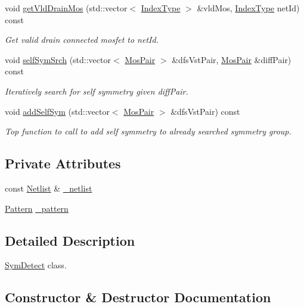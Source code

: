 \begin{DoxyCompactItemize}
void \hyperlink{classSymDetect_a48c23173bf5e56c3aa11ac306715cba2}{get\+Vld\+Drain\+Mos} (std\+::vector$<$ \hyperlink{type_8h_a581e8093e28e7362f2b6937296190676}{Index\+Type} $>$ \&vld\+Mos, \hyperlink{type_8h_a581e8093e28e7362f2b6937296190676}{Index\+Type} net\+Id) const
\begin{DoxyCompactList}\small\item\em Get valid drain connected mosfet to net\+Id. \end{DoxyCompactList}\item 
void \hyperlink{classSymDetect_ab6f286024b013fa257295111016da18b}{self\+Sym\+Srch} (std\+::vector$<$ \hyperlink{classMosPair}{Mos\+Pair} $>$ \&dfs\+Vst\+Pair, \hyperlink{classMosPair}{Mos\+Pair} \&diff\+Pair) const
\begin{DoxyCompactList}\small\item\em Iteratively search for self symmetry given diff\+Pair. \end{DoxyCompactList}\item 
void \hyperlink{classSymDetect_ac3075fde17fa6c33093a683b18f17086}{add\+Self\+Sym} (std\+::vector$<$ \hyperlink{classMosPair}{Mos\+Pair} $>$ \&dfs\+Vst\+Pair) const
\begin{DoxyCompactList}\small\item\em Top function to call to add self symmetry to already searched symmetry group. \end{DoxyCompactList}\end{DoxyCompactItemize}
\subsection*{Private Attributes}
\begin{DoxyCompactItemize}
\item 
const \hyperlink{classNetlist}{Netlist} \& \hyperlink{classSymDetect_aaa007c5c446ad65879c91e258542c9f3}{\+\_\+netlist}
\item 
\hyperlink{classPattern}{Pattern} \hyperlink{classSymDetect_a77937a3591871874553ea30e7d78fc2e}{\+\_\+pattern}
\end{DoxyCompactItemize}


\subsection{Detailed Description}
\hyperlink{classSymDetect}{Sym\+Detect} class. 

\subsection{Constructor \& Destructor Documentation}
\mbox{\label{classSymDetect_aaf0ca6563b2168db22cfd313ec773c23}} 
